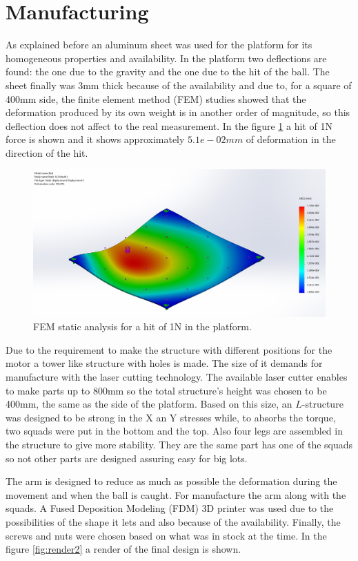 	\section{Manufacturing} %
	\label{sec:mechanics_manufacturing}
		As explained before an aluminum sheet was used for the platform for its homogeneous properties and availability. 
		In the platform two deflections are found: the one due to the gravity and the one due to the hit of the ball. 
		The sheet finally was 3\si{mm} thick because of the availability and due to, for a square of 400\si{mm} side, the finite element method (FEM) studies showed that the deformation produced by its own weight is in another order of magnitude, so this deflection does not affect to the real measurement. 
		In the figure \ref{fig:FEM} a hit of 1\si{N} force is shown and it shows approximately $5.1e-02\si{mm}$ of deformation in the direction of the hit.
		\begin{figure}[htb]
			\begin{center}
				\includegraphics[width=.8\textwidth]{figures/FEM}
			\end{center}
			\caption{FEM static analysis for a hit of 1\si{N} in the platform.}
			\label{fig:FEM}
		\end{figure}
		Due to the requirement to make the structure with different positions for the motor a tower like structure with holes is made. The size of it demands for manufacture with the laser cutting technology. 
		The available laser cutter enables to make parts up to 800\si{mm} so the total structure's height was chosen to be 400\si{mm}, the same as the side of the platform. 
		Based on this size, an $L$-structure was designed to be strong in the X an Y stresses while, to absorbs the torque, two squads were put in the bottom and the top.
		Also four legs are assembled in the structure to give more stability. They are the same part has one of the squads so not other parts are designed assuring easy for big lots.
		
		The arm is designed to reduce as much as possible the deformation during the movement and when the ball is caught. For manufacture the arm along with the squads. A Fused Deposition Modeling (FDM) 3D printer was used due to the possibilities of the shape it lets and also because of the availability. Finally, the screws and nuts were chosen based on what was in stock at the time. In the figure \ref{fig:render2} a render of the final design is shown.

